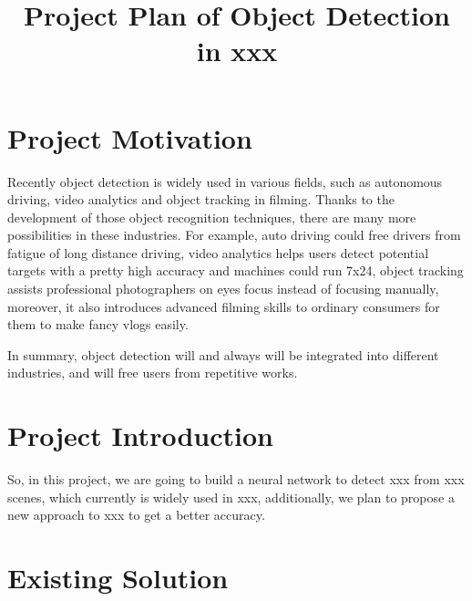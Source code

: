 \documentclass[conference]{IEEEtran}
\begin{document}
\title{Project Plan of Object Detection in xxx}

\author{
}
\maketitle

\renewcommand{\thefootnote}{\fnsymbol{footnote}}

\section{Project Motivation}

Recently object detection is widely used in various fields, such as autonomous driving, video analytics and object tracking in filming. Thanks to the development of those object recognition techniques, there are many more possibilities in these industries. For example, auto driving could free drivers from fatigue of long distance driving, video analytics helps users detect potential targets with a pretty high accuracy and machines could run 7x24, object tracking assists professional photographers on eyes focus instead of focusing manually, moreover, it also introduces advanced filming skills to ordinary consumers for them to make fancy vlogs easily.

In summary, object detection will and always will be integrated into different industries, and will free users from repetitive works.

\section{Project Introduction}

So, in this project, we are going to build a neural network to detect {xxx} from {xxx} scenes, which currently is widely used in {xxx}, additionally, we plan to propose a new approach to {xxx} to get a better accuracy.

\section{Existing Solution}
\end{document}
